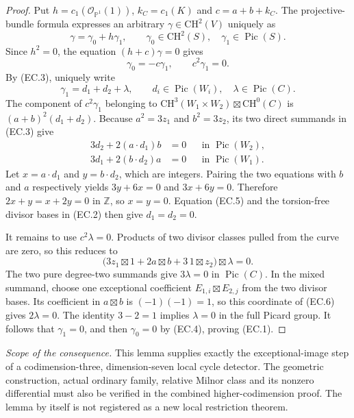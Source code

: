 \begin{proof}
Put $h=c_1(\mathcal O_{\mathbb P^1}(1))$, $k_C=c_1(K)$ and
$c=a+b+k_C$. The projective-bundle formula expresses an arbitrary
$\gamma\in\mathrm{CH}^2(V)$ uniquely as
\[
 \gamma=\gamma_0+h\gamma_1,
 \qquad\gamma_0\in\mathrm{CH}^2(S),\quad
 \gamma_1\in\operatorname{Pic}(S).
\]
Since $h^2=0$, the equation $(h+c)\gamma=0$ gives
\[
 \gamma_0=-c\gamma_1,
 \qquad c^2\gamma_1=0.
 \tag{EC.4}
\]
By (EC.3), uniquely write
\[
 \gamma_1=d_1+d_2+\lambda,
 \qquad d_i\in\operatorname{Pic}(W_i),\quad
 \lambda\in\operatorname{Pic}(C).
\]
The component of $c^2\gamma_1$ belonging to
$\mathrm{CH}^3(W_1\times W_2)\boxtimes\mathrm{CH}^0(C)$
is $(a+b)^2(d_1+d_2)$. Because $a^2=3z_1$ and $b^2=3z_2$,
its two direct summands in (EC.3) give
\[
 \begin{aligned}
 3d_2+2(a\cdot d_1)b&=0
                    &&\text{in }\operatorname{Pic}(W_2),\\
 3d_1+2(b\cdot d_2)a&=0
                    &&\text{in }\operatorname{Pic}(W_1).
 \end{aligned}
 \tag{EC.5}
\]
Let $x=a\cdot d_1$ and $y=b\cdot d_2$, which are integers.
Pairing the two equations with $b$ and $a$ respectively yields
$3y+6x=0$ and $3x+6y=0$. Therefore $2x+y=x+2y=0$ in
$\mathbb Z$, so $x=y=0$. Equation (EC.5) and the torsion-free
divisor bases in (EC.2) then give $d_1=d_2=0$.

It remains to use $c^2\lambda=0$.
Products of two divisor classes pulled from the curve are zero,
so this reduces to
\[
 \bigl(3z_1\boxtimes1+2a\boxtimes b
                         +3\,1\boxtimes z_2\bigr)\boxtimes\lambda=0.
 \tag{EC.6}
\]
The two pure degree-two summands give $3\lambda=0$ in
$\operatorname{Pic}(C)$. In the mixed summand, choose one exceptional
coefficient $E_{1,i}\boxtimes E_{2,j}$ from the two divisor bases.
Its coefficient in $a\boxtimes b$ is $(-1)(-1)=1$, so this
coordinate of (EC.6) gives $2\lambda=0$. The identity $3-2=1$
implies $\lambda=0$ in the full Picard group. It follows that
$\gamma_1=0$, and then $\gamma_0=0$ by (EC.4), proving (EC.1).
\end{proof}

\noindent\emph{Scope of the consequence.}
This lemma supplies exactly the exceptional-image step of a
codimension-three, dimension-seven local cycle detector. The
geometric construction, actual ordinary family, relative Milnor
class and its nonzero differential must also be verified in the
combined higher-codimension proof. The lemma by itself is not
registered as a new local restriction theorem.

